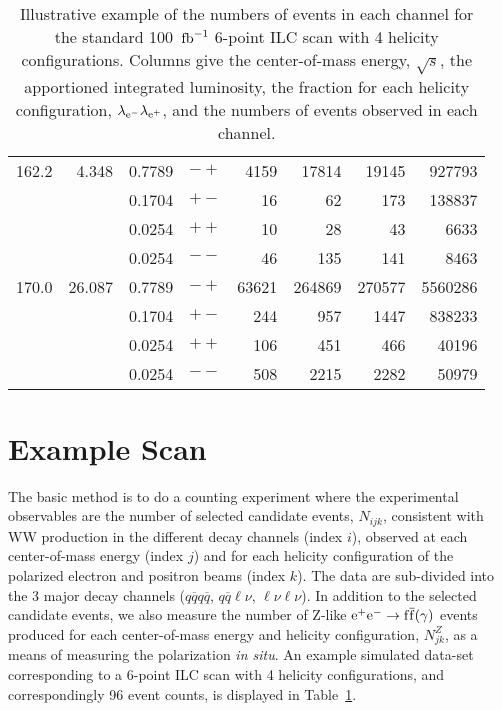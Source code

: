 \documentclass[12pt]{article}
\begin{document}
\begin{table}[!htb]
\begin{center}
\begin{tabular}{l|r|c|c|r|r|r|r}
     162.2 &      4.348 &     0.7789  & $-+$   &    4159  &   17814  &   19145  &  927793 \\ 
           &            &     0.1704  & $+-$   &      16  &      62  &     173  &  138837 \\ 
           &            &     0.0254  & $++$   &      10  &      28  &      43  &    6633 \\ 
           &            &     0.0254  & $--$   &      46  &     135  &     141  &    8463 \\ \hline

     170.0 &     26.087 &     0.7789  & $-+$   &   63621  &  264869  &  270577  & 5560286 \\ 
           &            &     0.1704  & $+-$   &     244  &     957  &    1447  &  838233 \\ 
           &            &     0.0254  & $++$   &     106  &     451  &     466  &   40196 \\ 
           &            &     0.0254  & $--$   &     508  &    2215  &    2282  &   50979 \\ \hline
\end{tabular}
\caption{Illustrative example of the numbers of events in each channel for the 
standard 100~$\rm{fb}^{-1}$ 6-point ILC scan with 4 helicity configurations. Columns give the center-of-mass energy, $\sqrt{s}$, 
the apportioned integrated luminosity, the fraction for each helicity configuration, $\lambda_{\rm{e}^{-}} \lambda_{\rm{e}^{+}} $, and the numbers 
of events observed in each channel.}
\label{tab:illustrate}
\end{center}
\end{table} 

\section*{Example Scan}
The basic method is to do a counting experiment where the experimental observables are the number 
of selected candidate events, $N_{ijk}$,  
consistent with WW production in the different decay channels (index $i$), observed at each 
center-of-mass energy (index $j$) and for each helicity configuration of the polarized electron and positron beams (index $k$).
The data are sub-divided into the 3 major decay channels ($q\overline{q}q\overline{q}$, $q\overline{q} \ell \nu$, $\ell \nu \ell\nu$).
In addition to the selected candidate events, we also measure the 
number of Z-like $\rm{e}^+\rm{e}^- \rightarrow f \overline{f} (\gamma)$ events produced for each center-of-mass energy 
and helicity configuration, $N^Z_{jk}$, 
as a means of measuring the polarization {\it in situ}.
An example simulated data-set corresponding to a 6-point ILC scan with 4 helicity configurations, and correspondingly 96 event counts, 
is displayed in Table~\ref{tab:illustrate}.
\end{document}
